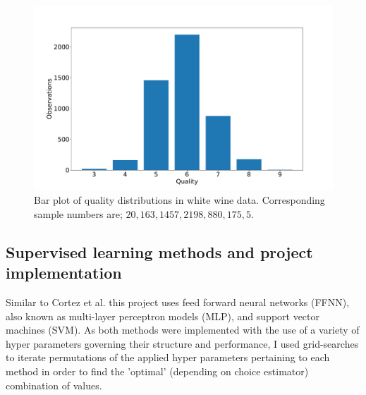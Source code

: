\documentclass[%
oneside,                 %
final,                   %
10pt]{article}
\begin{document}
\begin{figure}[!h]
        \centering 
         \includegraphics[scale=0.30]{../Results/bar_y.pdf} 
        \caption{Bar plot of quality distributions in white wine data. Corresponding sample numbers are; $20,163,1457,2198,880,175,5$.}
        \label{fig:initial}   
\end{figure}  

\subsection{Supervised learning methods and project implementation} 
Similar to Cortez et al. this project uses feed forward neural networks (FFNN), also known as multi-layer perceptron models (MLP), and support vector machines (SVM). As both methods were implemented with the use of a variety of hyper parameters governing their structure and performance, I used grid-searches to iterate permutations of the applied hyper parameters pertaining to each method in order to find the 'optimal' (depending on choice estimator) combination of values. 
\end{document}
